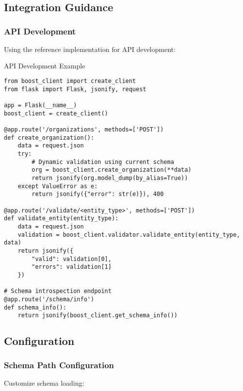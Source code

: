\subsection{Integration Guidance}
\label{sec:python-integration}

\subsubsection{API Development}
\label{sec:python-api-development}

Using the reference implementation for API development:

\begin{pythonexample}{API Development Example}
\begin{verbatim}
from boost_client import create_client
from flask import Flask, jsonify, request

app = Flask(__name__)
boost_client = create_client()

@app.route('/organizations', methods=['POST'])
def create_organization():
    data = request.json
    try:
        # Dynamic validation using current schema
        org = boost_client.create_organization(**data)
        return jsonify(org.model_dump(by_alias=True))
    except ValueError as e:
        return jsonify({"error": str(e)}), 400

@app.route('/validate/<entity_type>', methods=['POST'])
def validate_entity(entity_type):
    data = request.json
    validation = boost_client.validator.validate_entity(entity_type, data)
    return jsonify({
        "valid": validation[0],
        "errors": validation[1]
    })

# Schema introspection endpoint
@app.route('/schema/info')
def schema_info():
    return jsonify(boost_client.get_schema_info())
\end{verbatim}
\end{pythonexample}

\subsection{Configuration}
\label{sec:python-configuration}

\subsubsection{Schema Path Configuration}
\label{sec:python-schema-config}

Customize schema loading:

